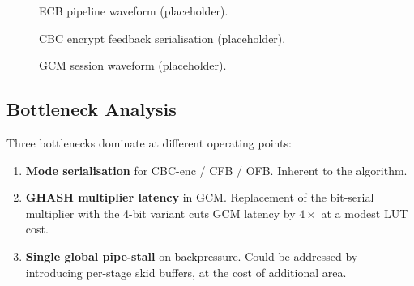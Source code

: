 \documentclass[conference,10pt,a4paper]{IEEEtran}
\begin{document}
\begin{figure}[t]
  \centering
  \caption{ECB pipeline waveform (placeholder).}
  \label{fig:wave-ecb}
\end{figure}

\begin{figure}[t]
  \centering
  \caption{CBC encrypt feedback serialisation (placeholder).}
  \label{fig:wave-cbc}
\end{figure}

\begin{figure}[t]
  \centering
  \caption{GCM session waveform (placeholder).}
  \label{fig:wave-gcm}
\end{figure}

\subsection{Bottleneck Analysis}
Three bottlenecks dominate at different operating points:
\begin{enumerate}[leftmargin=*]
  \item \textbf{Mode serialisation} for CBC-enc / CFB / OFB.  Inherent
        to the algorithm.
  \item \textbf{GHASH multiplier latency} in GCM.  Replacement of the
        bit-serial multiplier with the 4-bit variant cuts GCM latency
        by $4\times$ at a modest LUT cost.
  \item \textbf{Single global pipe-stall} on backpressure.  Could be
        addressed by introducing per-stage skid buffers, at the cost
        of additional area.
\end{enumerate}
\end{document}
